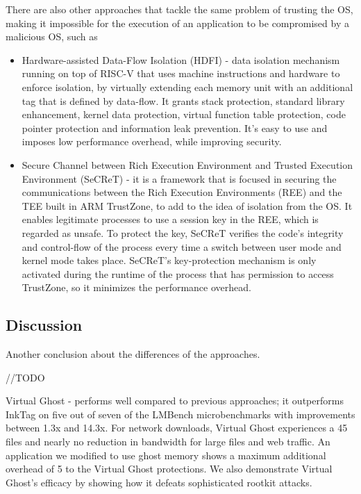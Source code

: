 There are also other approaches that tackle the same problem of trusting the OS, making it impossible for the execution of an  application to be compromised by a malicious OS, such as 

\begin{itemize}
	\item Hardware-assisted Data-Flow Isolation (HDFI) \cite{hdfiPaper} - data isolation mechanism running on top of RISC-V that uses machine instructions and hardware to enforce isolation, by virtually extending each memory unit with an additional tag that is defined by data-flow. It grants stack protection, standard library enhancement, kernel data protection, virtual function table protection, code pointer protection and information leak prevention. It's easy to use and imposes low performance overhead, while improving security.
	
	\item Secure Channel between Rich Execution Environment and Trusted Execution Environment (SeCReT) \cite{secretPaper} - it is a framework that is focused in securing the communications between the Rich Execution Environments (REE) and the TEE built in ARM TrustZone, to add to the idea of isolation from the OS. It enables legitimate processes to use a session key in the REE, which is regarded as unsafe. To protect the key, SeCReT verifies the code's integrity and control-flow of the process every time a switch between user mode and kernel mode takes place. SeCReT's key-protection mechanism is only activated during the runtime of the process that has permission to access TrustZone, so it minimizes the performance overhead.
	
	
\end{itemize}



\subsection{Discussion}
\label{ssec:tee_frameworks_discussion}

Another conclusion about the differences of the approaches. 
 
//TODO

Virtual Ghost - 
performs well compared to previous approaches; it outperforms InkTag on five out of seven of the
LMBench microbenchmarks with improvements between
1.3x and 14.3x. For network downloads, Virtual Ghost experiences a 45%
files and nearly no reduction in bandwidth for large files
and web traffic. An application we modified to use ghost
memory shows a maximum additional overhead of 5%
to the Virtual Ghost protections. We also demonstrate Virtual Ghost’s efficacy by showing how it defeats sophisticated
rootkit attacks.


